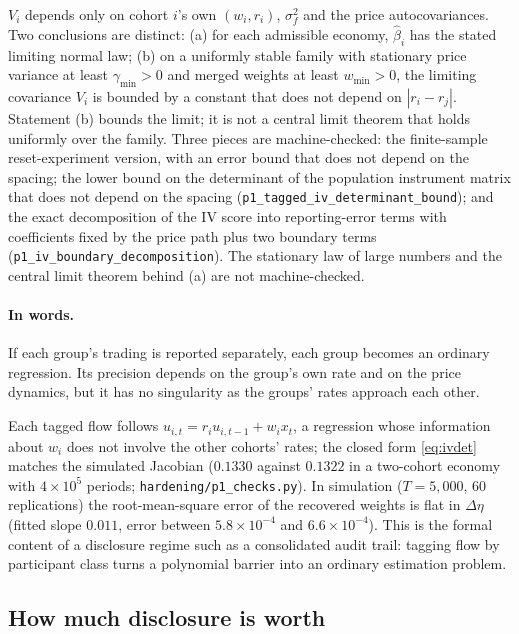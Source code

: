 \begin{proposition}
$V_i$ depends only on cohort $i$'s own $(w_i,r_i)$, $\sigma_f^2$ and the price autocovariances. Two conclusions are distinct: (a) for each admissible economy, $\hat\beta_i$ has the stated limiting normal law; (b) on a uniformly stable family with stationary price variance at least $\gamma_{\min}>0$ and merged weights at least $w_{\min}>0$, the limiting covariance $V_i$ is bounded by a constant that does not depend on $|r_i-r_j|$. Statement (b) bounds the limit; it is not a central limit theorem that holds uniformly over the family. Three pieces are machine-checked: the finite-sample reset-experiment version, with an error bound that does not depend on the spacing; the lower bound on the determinant of the population instrument matrix that does not depend on the spacing (\texttt{p1\_tagged\_iv\_determinant\_bound}); and the exact decomposition of the IV score into reporting-error terms with coefficients fixed by the price path plus two boundary terms (\texttt{p1\_iv\_boundary\_decomposition}). The stationary law of large numbers and the central limit theorem behind (a) are not machine-checked.
\end{proposition}

\paragraph{In words.} If each group's trading is reported separately, each group becomes an ordinary regression. Its precision depends on the group's own rate and on the price dynamics, but it has no singularity as the groups' rates approach each other.


Each tagged flow follows $u_{i,t}=r_iu_{i,t-1}+w_ix_t$, a regression whose information about $w_i$ does not involve the other cohorts' rates; the closed form \eqref{eq:ivdet} matches the simulated Jacobian ($0.1330$ against $0.1322$ in a two-cohort economy with $4\times10^5$ periods; \texttt{hardening/p1\_checks.py}). In simulation ($T=5{,}000$, 60 replications) the root-mean-square error of the recovered weights is flat in $\Delta\eta$ (fitted slope $0.011$, error between $5.8\times10^{-4}$ and $6.6\times10^{-4}$). This is the formal content of a disclosure regime such as a consolidated audit trail: tagging flow by participant class turns a polynomial barrier into an ordinary estimation problem.

\subsection{How much disclosure is worth}\label{sec:discvalue}

